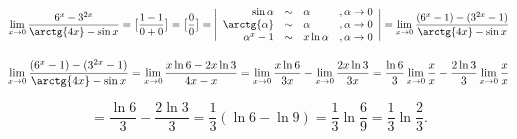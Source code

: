 {}

$$
  \lim_{x\to{0}} \dfrac{6^x-3^{2x}}{\arctg{4x}-\sin{x}} = \big[ \dfrac{1-1}{0+0}\big] = \big[ \dfrac{0}{0}\big] = \Bigg |
    \begin{array}{rcll}
        \sin{\alpha}   & \sim & \alpha & , \alpha \to 0 \\
        \arctg{\alpha} & \sim & \alpha & , \alpha \to 0 \\
        \alpha^x-1 & \sim & x\ln\alpha & , \alpha \to 0 \\
      \end{array}
  \Bigg | = \lim_{x\to{0}} \dfrac{(6^x-1)-(3^{2x}-1)}{\arctg{4x}-\sin{x}}
$$


$$
\lim_{x\to{0}} \dfrac{(6^x-1)-(3^{2x}-1)}{\arctg{4x}-\sin{x}}
= \lim_{x\to{0}} \dfrac{x\ln{6}-2x\ln{3}}{4x-x}
= \lim_{x\to{0}} \dfrac{x\ln{6}}{3x} - \lim_{x\to{0}} \dfrac{2x\ln{3}}{3x}
= \dfrac{\ln{6}}{3} \lim_{x\to{0}} \dfrac{x}{x} - \dfrac{2\ln{3}}{3} \lim_{x\to{0}} \dfrac{x}{x}
$$

$$
= \dfrac{\ln{6}}{3}  - \dfrac{2\ln{3}}{3}
= \dfrac{1}{3}(\ln{6} - \ln{9})
= \dfrac{1}{3}\ln{\dfrac{6}{9}}
= \dfrac{1}{3}\ln{\dfrac{2}{3}}.
$$
